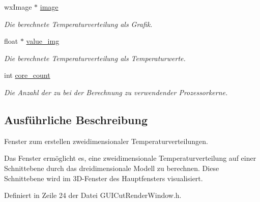 \begin{DoxyCompactItemize}
wx\-Image $\ast$ \hyperlink{classGUICutRenderWindow_a30c36db74a83fc5523407d3611c1db34}{image}
\begin{DoxyCompactList}\small\item\em Die berechnete Temperaturverteilung als Grafik. \end{DoxyCompactList}\item 
float $\ast$ \hyperlink{classGUICutRenderWindow_a9c8338a733363aea25a8735d6873a414}{value\-\_\-img}
\begin{DoxyCompactList}\small\item\em Die berechnete Temperaturverteilung als Temperaturwerte. \end{DoxyCompactList}\item 
int \hyperlink{classGUICutRenderWindow_a365103460aeafd2173c0a9360cc0caa1}{core\-\_\-count}
\begin{DoxyCompactList}\small\item\em Die Anzahl der zu bei der Berechnung zu verwendender Prozessorkerne. \end{DoxyCompactList}\end{DoxyCompactItemize}


\subsection{Ausführliche Beschreibung}
Fenster zum erstellen zweidimensionaler Temperaturverteilungen. 

Das Fenster ermöglicht es, eine zweidimensionale Temperaturverteilung auf einer Schnittebene durch das dreidimensionale Modell zu berechnen. Diese Schnittebene wird im 3\-D-\/\-Fenster des Hauptfensters visualisiert. 

Definiert in Zeile 24 der Datei G\-U\-I\-Cut\-Render\-Window.\-h.



